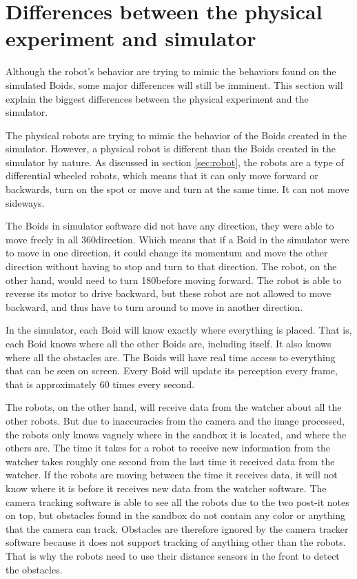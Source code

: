 
\section{Differences between the physical experiment and simulator}
\label{sec:vs}
Although the robot's behavior are trying to mimic the behaviors found on the simulated Boids, some major differences will still be imminent. This section will explain the biggest differences between the physical experiment and the simulator. 

The physical robots are trying to mimic the behavior of the Boids created in the simulator. However, a physical robot is different than the Boids created in the simulator by nature. As discussed in section \ref{sec:robot}, the robots are a type of differential wheeled robots, which means that it can only move forward or backwards, turn on the spot or move and turn at the same time. It can not move sideways.

The Boids in simulator software did not have any direction, they were able to move freely in all 360\textdegree direction. Which means that if a Boid in the simulator were to move in one direction, it could change its momentum and move the other direction without having to stop and turn to that direction. The robot, on the other hand, would need to turn 180\textdegree before moving forward. The robot is able to reverse its motor to drive backward, but these robot are not allowed to move backward, and thus have to turn around to move in another direction.

In the simulator, each Boid will know exactly where everything is placed. That is, each Boid knows where all the other Boids are, including itself. It also knows where all the obstacles are. The Boids will have real time access to everything that can be seen on screen. Every Boid will update its perception every frame, that is approximately 60 times every second.

The robots, on the other hand, will receive data from the watcher about all the other robots. But due to inaccuracies from the camera and the image processed, the robots only knows vaguely where in the sandbox it is located, and where the others are. The time it takes for a robot to receive new information from the watcher takes roughly one second from the last time it received data from the watcher. If the robots are moving between the time it receives data, it will not know where it is before it receives new data from the watcher software. The camera tracking software is able to see all the robots due to the two post-it notes on top, but obstacles found in the sandbox do not contain any color or anything that the camera can track. Obstacles are therefore ignored by the camera tracker software because it does not support tracking of anything other than the robots. That is why the robots need to use their distance sensors in the front to detect the obstacles.


